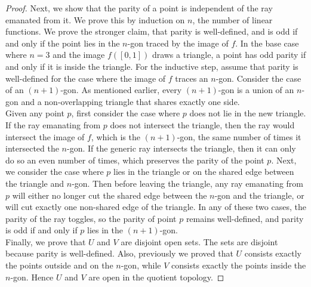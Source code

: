 \documentclass{article}
\begin{document}
\begin{enumerate}
\begin{enumerate}
\begin{proof}
          Next, we show that the parity of a point is independent of the
          ray emanated from it. We prove this by induction on $n$, the
          number of linear functions. We prove the stronger claim, that
          parity is well-defined, and is odd if and only if the point lies
          in the $n$-gon traced by the image of $f$. In the base case where
          $n=3$ and the image $f([0,1])$ draws a triangle, a point has odd
          parity if and only if it is inside the triangle. For the
          inductive step, assume that parity is well-defined for the case
          where the image of $f$ traces an $n$-gon. Consider the case of an
          $(n+1)$-gon. As mentioned earlier, every $(n+1)$-gon is a union
          of an $n$-gon and a non-overlapping triangle that shares exactly
          one side. \\

          Given any point $p$, first consider the case where $p$ does not
          lie in the new triangle. If the ray emanating from $p$ does not
          intersect the triangle, then the ray would intersect the
          image of $f$, which is the $(n+1)$-gon, the same number of times
          it intersected the $n$-gon. If the generic ray intersects the
          triangle, then it can only do so an even number of times, which
          preserves the parity of the point $p$. Next, we consider the case
          where $p$ lies in the triangle or on the shared edge between the
          triangle and $n$-gon. Then before leaving the triangle, any ray
          emanating from $p$ will either no longer cut the shared edge
          between the $n$-gon and the triangle, or will cut exactly one
          non-shared edge of the triangle. In any of these two cases, the
          parity of the ray toggles, so the parity of point $p$ remains
          well-defined, and parity is odd if and only if $p$ lies in the
          $(n+1)$-gon. \\

          Finally, we prove that $U$ and $V$ are disjoint open sets. The
          sets are disjoint because parity is well-defined. Also,
          previously we proved that $U$ consists exactly the points outside
          and on the $n$-gon, while $V$ consists exactly the points inside
          the $n$-gon. Hence $U$ and $V$ are open in the quotient topology. 
        \end{proof}
    \end{enumerate}
\end{enumerate}
\end{document}
